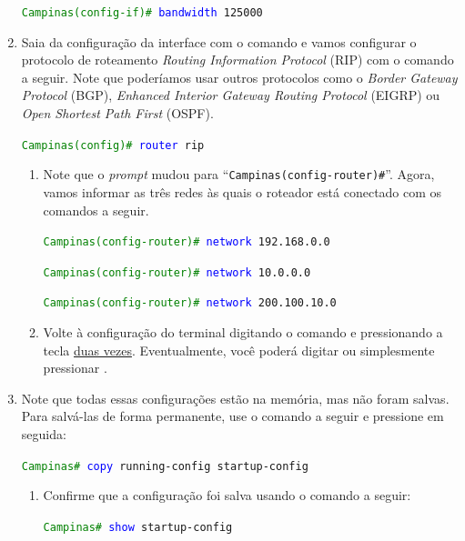 \begin{enumerate}[label*=\arabic*.]
       \texttt{\textcolor{green}{Campinas(config-if)\#} \textcolor{blue}{bandwidth} 125000}

  \item Saia da configuração da interface com o comando  e vamos configurar o protocolo de roteamento \textit{Routing Information Protocol} (RIP) com o comando a seguir. Note que poderíamos usar outros protocolos como o \textit{Border Gateway Protocol} (BGP), \textit{Enhanced Interior Gateway Routing Protocol} (EIGRP) ou \textit{Open Shortest Path First} (OSPF).

        \texttt{\textcolor{green}{Campinas(config)\#} \textcolor{blue}{router} rip}
  
  \begin{enumerate}[label*=\arabic*.]
    \item Note que o \textit{prompt} mudou para \enquote{\texttt{Campinas(config-router)\#}}. Agora, vamos informar as três redes às quais o roteador está conectado com os comandos a seguir. 

        \texttt{\textcolor{green}{Campinas(config-router)\#} \textcolor{blue}{network} 192.168.0.0}

        \texttt{\textcolor{green}{Campinas(config-router)\#} \textcolor{blue}{network} 10.0.0.0}

        \texttt{\textcolor{green}{Campinas(config-router)\#} \textcolor{blue}{network} 200.100.10.0}

    \item Volte à configuração do terminal digitando o comando  e pressionando a tecla \keys{\enter} \underline{duas vezes}. Eventualmente, você poderá digitar  ou simplesmente pressionar .
  \end{enumerate}
  
  \item Note que todas essas configurações estão na memória, mas não foram salvas. Para salvá-las de forma permanente, use o comando a seguir e pressione \keys{\enter} em seguida:

       \texttt{\textcolor{green}{Campinas\#} \textcolor{blue}{copy} running-config startup-config}
  \begin{enumerate}[label*=\arabic*.]
    \item Confirme que a configuração foi salva usando o comando a seguir:

      \texttt{\textcolor{green}{Campinas\#} \textcolor{blue}{show} startup-config}
  \end{enumerate}
\end{enumerate}

